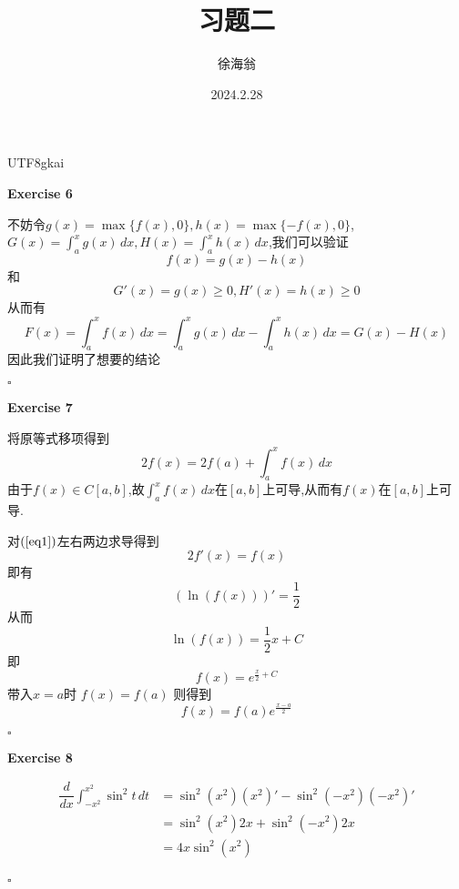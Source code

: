 \documentclass{article}
\title{习题二}
\author{徐海翁}
\date{2024.2.28}
\newenvironment{exercise}[1]{%
{\textbf{Exercise #1} \\ 
    }
}{
  \hfill $\square$ 
  \par\bigskip 
}
\newcommand{\parameter}[1]{\left(#1\right)}
\begin{document}
\begin{CJK}{UTF8}{gkai}

\maketitle
\tableofcontents

\begin{exercise}{6}
    不妨令$g(x) = \max\{f(x),0\},h(x) = \max\{-f(x),0\}$, $G(x) = \int_{a}^{x}g(x)\,dx , H(x) = \int_{a}^{x}h(x)\,dx$,我们可以验证
    \[f(x) = g(x) - h(x)\]
    和
    \[G'(x) = g(x) \geq 0, H'(x) = h(x) \geq 0\]
    从而有
    \[F(x) = \int_{a}^{x} f(x)\, dx = \int_{a}^{x} g(x)\, dx - \int_{a}^{x} h(x)\, dx = G(x) - H(x)\]
    因此我们证明了想要的结论
\end{exercise}

\begin{exercise}{7}
    将原等式移项得到
    \begin{equation}
        2 f(x) = 2 f(a) + \int_{a}^{x} f(x)\, dx
        \label{eq1}
    \end{equation}
    由于$f(x)\in C[a,b]$,故$\int_{a}^{x} f(x)\, dx$在$[a,b]$上可导,从而有$f(x)$在$[a,b]$上可导.

    对$(\ref{eq1})$左右两边求导得到
    \[2f'(x) = f(x)\]
    即有
    \[\parameter{\ln(f(x))}' = \dfrac{1}{2}\]
    从而
    \[\ln (f(x)) = \dfrac{1}{2}x + C\]
    即
    \[f(x) = e^{\frac{x}{2} + C}\]
    带入$x = a $时 $f(x) = f(a)$ 则得到
    \[f(x) = f(a) e^{\frac{x - a}{2}}\]
\end{exercise}

\begin{exercise}{8}
    \[\begin{aligned}
        \dfrac{d}{dx} \int_{-x^2}^{x^2} \sin^2 t\,dt &= \sin^2 (x^2) (x^2)' - \sin^2 (-x^2) (-x^2)' \\
        &= \sin^2 (x^2) 2x + \sin^2 (-x^2) 2x\\
        &= 4 x\sin^2 (x^2)\\
    \end{aligned}\]
\end{exercise}


\end{CJK}
\end{document}
